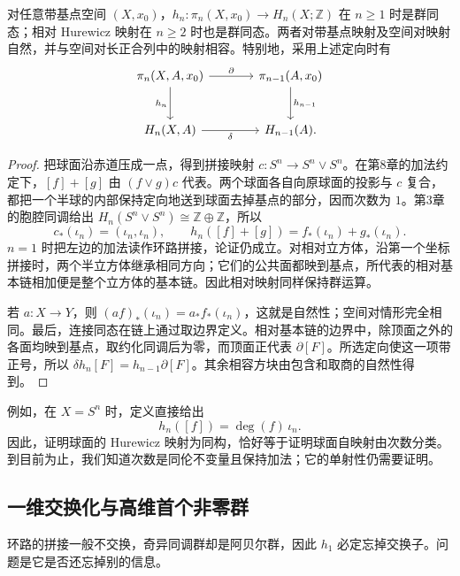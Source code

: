 \begin{proposition}\label{g2:prop:hurewicz-naturality}
	对任意带基点空间 \((X,x_0)\)，\(h_n:\pi_n(X,x_0)\to H_n(X;\mathbb Z)\) 在 \(n\ge1\) 时是群同态；相对 Hurewicz 映射在 \(n\ge2\) 时也是群同态。两者对带基点映射及空间对映射自然，并与空间对长正合列中的映射相容。特别地，采用上述定向时有
	\[
		\begin{tikzcd}[column sep=large,row sep=large]
			\pi_n(X,A,x_0) \arrow[r,"\partial"] \arrow[d,"h_n"'] & \pi_{n-1}(A,x_0) \arrow[d,"h_{n-1}"] \\
			H_n(X,A) \arrow[r,"\delta"'] & H_{n-1}(A).
		\end{tikzcd}
	\]
\end{proposition}
\begin{proof}
	把球面沿赤道压成一点，得到拼接映射 \(c:S^n\to S^n\vee S^n\)。在第8章的加法约定下，\([f]+[g]\) 由 \((f\vee g)c\) 代表。两个球面各自向原球面的投影与 \(c\) 复合，都把一个半球的内部保持定向地送到球面去掉基点的部分，因而次数为 \(1\)。第3章的胞腔同调给出 \(H_n(S^n\vee S^n)\cong\mathbb Z\oplus\mathbb Z\)，所以
	\[
		c_*(\iota_n)=(\iota_n,\iota_n),\qquad h_n([f]+[g])=f_*(\iota_n)+g_*(\iota_n).
	\]
	\(n=1\) 时把左边的加法读作环路拼接，论证仍成立。对相对立方体，沿第一个坐标拼接时，两个半立方体继承相同方向；它们的公共面都映到基点，所代表的相对基本链相加便是整个立方体的基本链。因此相对映射同样保持群运算。

	若 \(a:X\to Y\)，则 \((af)_*(\iota_n)=a_*f_*(\iota_n)\)，这就是自然性；空间对情形完全相同。最后，连接同态在链上通过取边界定义。相对基本链的边界中，除顶面之外的各面均映到基点，取约化同调后为零，而顶面正代表 \(\partial[F]\)。所选定向使这一项带正号，所以 \(\delta h_n[F]=h_{n-1}\partial[F]\)。其余相容方块由包含和取商的自然性得到。
\end{proof}

例如，在 \(X=S^n\) 时，定义直接给出
\[
	h_n([f])=\deg(f)\,\iota_n.
\]
因此，证明球面的 Hurewicz 映射为同构，恰好等于证明球面自映射由次数分类。到目前为止，我们知道次数是同伦不变量且保持加法；它的单射性仍需要证明。

\subsection{一维交换化与高维首个非零群}
\label{g2:subsec:0902:02}

环路的拼接一般不交换，奇异同调群却是阿贝尔群，因此 \(h_1\) 必定忘掉交换子。问题是它是否还忘掉别的信息。

